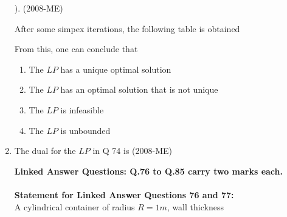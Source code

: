 \documentclass[journal]{IEEEtran}
\begin{document}
\begin{enumerate}
). \hfill (2008-ME)
\begin{table}[H]
    \centering
 
\end{table}
After some simpex iterations, the following table is obtained  
\begin{table}[H]
    \centering
 
\end{table}
From this, one can conclude that
\begin{enumerate}
    \item The $LP$ has a unique optimal solution 
    \item The $LP$ has an optimal solution that is not unique 
    \item The $LP$ is infeasible 
    \item The $LP$ is unbounded
\end{enumerate}
\item The dual for the $LP$ in Q 74 is \hfill (2008-ME)
\begin{enumerate}
\end{enumerate}
{\large \textbf{Linked Answer Questions: Q.76 to Q.85 carry two marks each.}} \\ \\
\textbf{Statement for Linked Answer Questions 76 and 77:} \\ A cylindrical container of radius $R = 1m$, wall thickness 

\end{enumerate}
\end{document}
